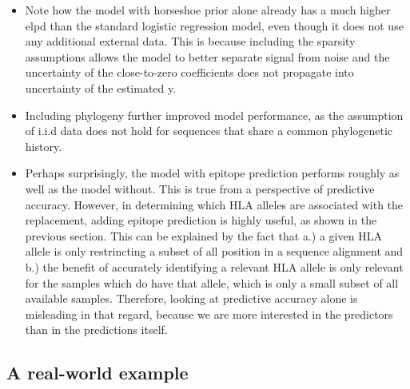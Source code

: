 \documentclass[fleqn,11pt]{SelfArx} %
\begin{document}
\begin{itemize}
  \item Note how the model with horseshoe prior alone already has a much higher elpd than the standard logistic regression model, even though it does not use any additional external data. This is because including the sparsity assumptions allows the model to better separate signal from noise and the uncertainty of the close-to-zero coefficients does not propagate into uncertainty of the estimated y.
  \item Including phylogeny further improved model performance, as the assumption of i.i.d data does not hold for sequences that share a common phylogenetic history.
  \item Perhaps surprisingly, the model with epitope prediction performs roughly as well as the model without. This is true from a perspective of predictive accuracy. However, in determining which HLA alleles are associated with the replacement, adding epitope prediction is highly useful, as shown in the previous section. This can be explained by the fact that a.) a given HLA allele is only restrincting a subset of all position in a sequence alignment and b.) the benefit of accurately identifying a relevant HLA allele is only relevant for the samples which do have that allele, which is only a small subset of all available samples. Therefore, looking at predictive accuracy alone is misleading in that regard, because we are more interested in the predictors than in the predictions itself.
\end{itemize}

\subsection{A real-world example}
\end{document}
